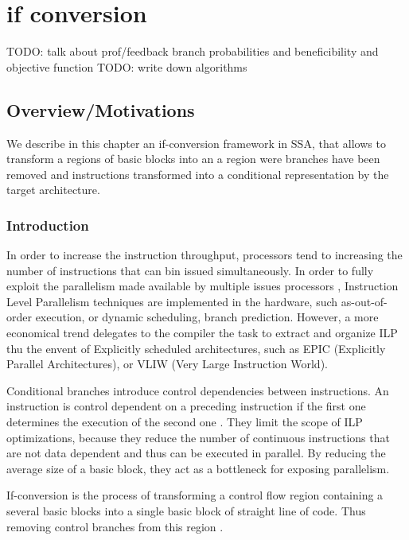 \chapter{if conversion }
\graphicspath{{img/}{if_conversion/img/}{part4/if_conversion/img/}}
	
\newcommand\cond{~?~}

TODO: talk about prof/feedback branch probabilities and beneficibility and objective function
TODO: write down algorithms

\section{Overview/Motivations}

We describe in this chapter an if-conversion framework in SSA, that allows to transform a regions of basic blocks into an a region were branches have been removed and instructions transformed into a conditional representation by the target architecture.
\subsection{Introduction}

In order to increase the instruction throughput, processors tend to increasing the number of instructions that can bin issued simultaneously. In order to fully exploit the parallelism made available by multiple issues processors \cite{Rau:2003:IP:1074100.1074489}, Instruction Level Parallelism techniques are implemented in the hardware, such as-out-of-order execution, or dynamic scheduling, branch prediction. However, a more economical trend delegates to the compiler the task to extract and organize ILP thu the envent of Explicitly scheduled architectures, such as EPIC (Explicitly Parallel Architectures), or VLIW (Very Large Instruction World).

Conditional branches introduce control dependencies between instructions. An instruction is control dependent on a preceding instruction if the first one determines the execution of the second one \cite{Kennedy:2001:OCM:502981}. They limit the scope of ILP optimizations, because they reduce the number of continuous instructions that are not data dependent and thus can be executed in parallel. By reducing the average size of a basic block, they act as a bottleneck for exposing parallelism.

If-conversion is the process of transforming a control flow region containing a several basic blocks into a single basic block of straight line of code. Thus removing control branches from this region \cite{Schlansker97achievinghigh}.

